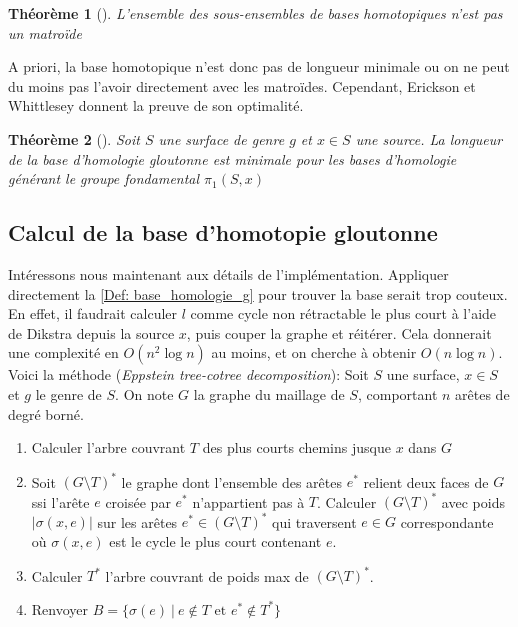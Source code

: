 \documentclass[french]{article}
\newtheorem{thm}{Théorème}[section]
\begin{document}
\begin{thm}[\cite{erickson_whittlesey}]
    L'ensemble des sous-ensembles de bases homotopiques n'est pas un matroïde
\end{thm}

A priori, la base homotopique n'est donc pas de longueur minimale ou on ne peut du moins pas l'avoir directement avec les matroïdes. 
Cependant, Erickson et Whittlesey donnent la preuve de son optimalité.

\begin{thm}[\cite{erickson_whittlesey}]
    Soit $S$ une surface de genre $g$ et $x \in S$ une source.
    La longueur de la base d'homologie gloutonne est minimale pour les bases d'homologie générant le groupe fondamental $\pi_1(S, x)$
\end{thm}

\subsection{Calcul de la base d'homotopie gloutonne}

Intéressons nous maintenant aux détails de l'implémentation. 
Appliquer directement la \autoref{Def: base_homologie_g} pour trouver la base serait trop couteux.
En effet, il faudrait calculer $l$ comme cycle non rétractable le plus court à l'aide de Dikstra depuis la source $x$, puis couper la graphe et réitérer.
Cela donnerait une complexité en $O(n^2 \log n)$ au moins, et on cherche à obtenir $O(n \log n)$. \\

\noindent Voici la méthode (\textit{Eppstein tree-cotree decomposition}):
Soit $S$ une surface, $x \in S$ et $g$ le genre de $S$. 
On note $G$ la graphe du maillage de $S$, comportant $n$ arêtes de degré borné.

\begin{enumerate}
    \item Calculer l’arbre couvrant $T$ des plus courts chemins jusque $x$ dans $G$ 
    \item Soit $(G \setminus T)^*$ le graphe dont l'ensemble des arêtes $e^*$ relient deux faces de $G$ ssi l'arête $e$ croisée par $e^*$ n'appartient pas à $T$.
    Calculer $(G \setminus T)^*$ avec poids $|\sigma(x, e)|$ 
    sur les arêtes $e^* \in (G\setminus T)^*$ qui traversent $e \in G$ correspondante 
    où $\sigma(x, e)$ est le cycle le plus court contenant $e$.
    \item Calculer $T^*$ l’arbre couvrant de poids max de $(G \setminus T)^*$.
    \item Renvoyer $B=\{\sigma(e) \ |\ e \notin T \text{ et } e^* \notin T^*\}$
\end{enumerate}
\end{document}
